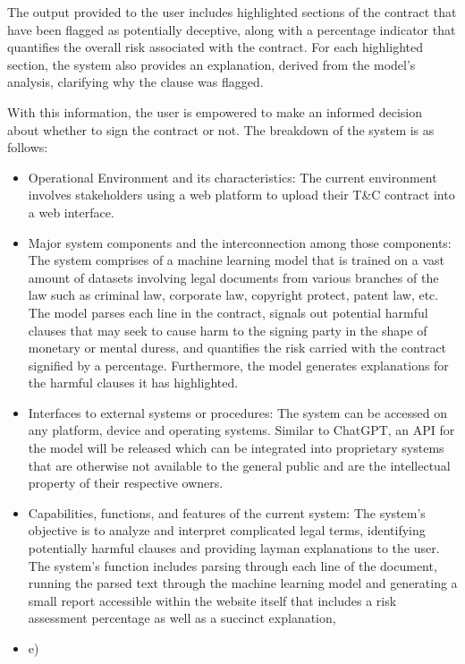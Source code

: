The output provided to the user includes highlighted sections of the contract that have been flagged as potentially deceptive, along with a percentage indicator that quantifies the overall risk associated with the contract. For each highlighted section, the system also provides an explanation, derived from the model's analysis, clarifying why the clause was flagged.

With this information, the user is empowered to make an informed decision about whether to sign the contract or not. 
The breakdown of the system is as follows: 
\begin{itemize}
    \item Operational Environment and its characteristics: The current environment involves stakeholders using a web platform to upload their T\&C contract into a web interface. 
    \item Major system components and the interconnection among those components: The system comprises of a machine learning model that is trained on a vast amount of datasets involving legal documents from various branches of the law such as criminal law, corporate law, copyright protect, patent law, etc. The model parses each line in the contract, signals out potential harmful clauses that may seek to cause harm to the signing party in the shape of monetary or mental duress, and quantifies the risk carried with the contract signified by a percentage. Furthermore, the model generates explanations for the harmful clauses it has highlighted. 
    \item Interfaces to external systems or procedures: The system can be accessed on any platform, device and operating systems. Similar to ChatGPT, an API for the model will be released which can be integrated into proprietary systems that are otherwise not available to the general public and are the intellectual property of their respective owners. 
    \item Capabilities, functions, and features of the current system: The system's objective is to analyze and interpret complicated legal terms, identifying potentially harmful clauses and providing layman explanations to the user. The system's function includes parsing through each line of the document, running the parsed text through the machine learning model and generating a small report accessible within the website itself that includes a risk assessment percentage as well as a succinct explanation, 
    \item e)                \begin{figure}[H]

\end{figure}
\end{itemize}
